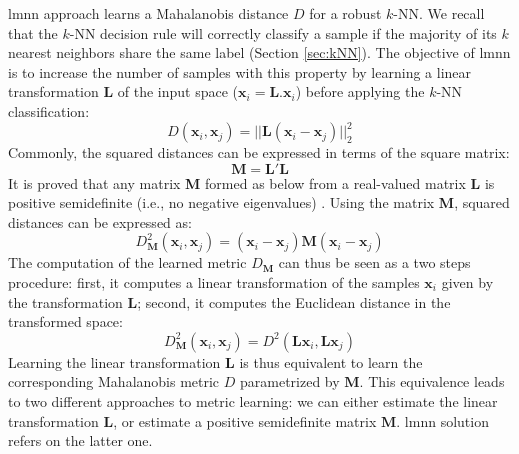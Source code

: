 {\sc lmnn} approach learns a Mahalanobis distance $D$ for a robust $k$-NN. We recall that the $k$-NN decision rule will correctly classify a sample if the majority of its $k$ nearest neighbors share the same label (Section \ref{sec:kNN}). 
The objective of {\sc lmnn} is to increase the number of samples with this property by learning a linear transformation $\textbf{L}$ of the input space ($\textbf{x}_i=\textbf{L}.\textbf{x}_i$) before applying the $k$-NN classification:
\begin{equation}
	D(\textbf{x}_i,\textbf{x}_j) = ||\textbf{L}(\textbf{x}_i-\textbf{x}_j)||_2^2
	\label{eq:lin}
\end{equation}
Commonly, the squared distances can be expressed in terms of the square matrix:
\begin{equation}
\textbf{M} = \textbf{L}'\textbf{L}
\end{equation}
It is proved that any matrix \textbf{M} formed as below from a real-valued matrix \textbf{L} is positive semidefinite (i.e., no negative eigenvalues) \cite{Weinberger2009}. Using the matrix \textbf{M}, squared distances can be expressed as:
\begin{equation}
D^2_\textbf{M}(\textbf{x}_i,\textbf{x}_j) = (\textbf{x}_i-\textbf{x}_j)\textbf{M}(\textbf{x}_i-\textbf{x}_j)
\end{equation}
\noindent The computation of the learned metric $D_\textbf{M}$ can thus be seen as a two steps procedure: first, it computes a linear transformation of the samples $\textbf{x}_i$ given by the transformation $\textbf{L}$; second, it computes the Euclidean distance in the transformed space:
\begin{equation}
D^2_\textbf{M}(\textbf{x}_i,\textbf{x}_j) = D^2(\textbf{L} \textbf{x}_i,\textbf{L} \textbf{x}_j)
\end{equation}
Learning the linear transformation $\textbf{L}$ is thus equivalent to learn the corresponding Mahalanobis metric $D$ parametrized by $\textbf{M}$. This equivalence leads to two different approaches to metric learning: we can either estimate the linear transformation $\textbf{L}$, or estimate a positive semidefinite matrix $\textbf{M}$. {\sc lmnn} solution refers on the latter one.



